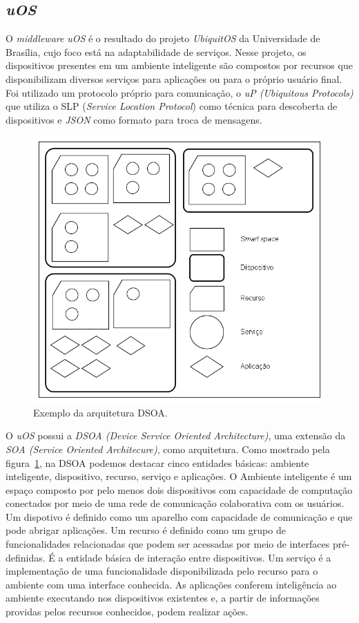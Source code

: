 \subsection{\emph{uOS}}
\label{subsec:introUos}

O \emph{middleware} \emph{uOS} é o resultado do projeto \emph{UbiquitOS} da Universidade de Brasília, cujo foco está na adaptabilidade de serviços. Nesse projeto, os dispositivos presentes em um ambiente inteligente são compostos por recursos que disponibilizam diversos serviços para aplicações ou para o próprio usuário final. Foi utilizado um protocolo próprio para comunicação, o \emph{uP (Ubiquitous Protocols)} que utiliza o SLP (\emph{Service Location Protocol}) como técnica para descoberta de dispositivos e \emph{JSON} como formato para troca de mensagens.

\begin{figure}[ht]
	\center
	\includegraphics[scale=0.6]{imagens/arquiteturaDSOA}
	\caption{Exemplo da arquitetura DSOA.}
	\label{fig:arquiteturaDSOA}
\end{figure}

O \emph{uOS} possui a \emph{DSOA (Device Service Oriented Architecture)}, uma extensão da \emph{SOA (Service Oriented Architecure)}, como arquitetura. Como mostrado pela figura~\ref{fig:arquiteturaDSOA}, na DSOA podemos destacar cinco entidades básicas: ambiente inteligente, dispositivo, recurso, serviço e aplicações. O Ambiente inteligente é um espaço composto por pelo menos dois dispositivos com capacidade de computação conectados por meio de uma rede de comunicação colaborativa com os usuários. Um dispotivo é definido como um aparelho com capacidade de comunicação e que pode abrigar aplicações. Um recurso é definido como um grupo de funcionalidades relacionadas que podem ser acessadas por meio de interfaces pré-definidas. É a entidade básica de interação entre dispositivos. Um serviço é a implementação de uma funcionalidade disponibilizada pelo recurso para o ambiente com uma interface conhecida. As aplicações conferem inteligência ao ambiente executando nos dispositivos existentes e, a partir de informações providas pelos recursos conhecidos, podem realizar ações. 

